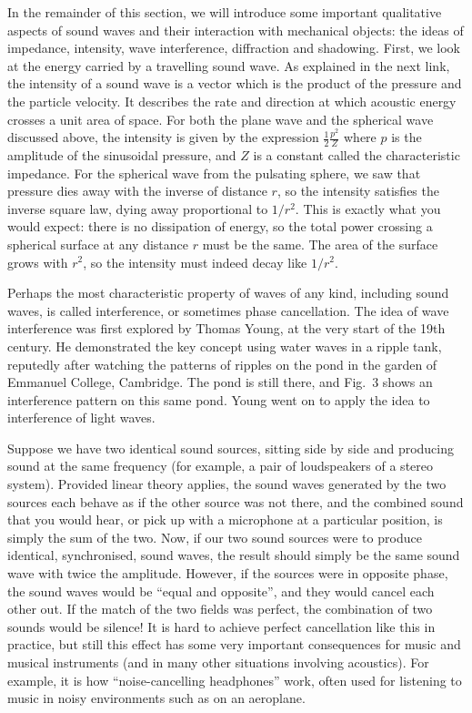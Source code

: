   In the remainder of this section, we will introduce some important 
  qualitative aspects of sound waves and their interaction with mechanical 
  objects: the ideas of impedance, intensity, wave interference, diffraction 
  and shadowing. First, we look at the energy carried by a travelling sound 
  wave. As explained in the next link, the intensity of a sound wave is a 
  vector which is the product of the pressure and the particle velocity. It 
  describes the rate and direction at which acoustic energy crosses a unit area 
  of space. For both the plane wave and the spherical wave discussed above, the 
  intensity is given by the expression $\frac{1}{2} \frac{p^2}{Z}$ where $p$ is 
  the amplitude of the sinusoidal pressure, and $Z$ is a constant called the 
  characteristic impedance. For the spherical wave from the pulsating sphere, 
  we saw that pressure dies away with the inverse of distance $r$, so the 
  intensity satisfies the inverse square law, dying away proportional to 
  $1/r^2$. This is exactly what you would expect: there is no dissipation of 
  energy, so the total power crossing a spherical surface at any distance $r$ 
  must be the same. The area of the surface grows with $r^2$, so the intensity 
  must indeed decay like $1/r^2$. 

  Perhaps the most characteristic property of waves of any kind, including 
  sound waves, is called interference, or sometimes phase cancellation. The 
  idea of wave interference was first explored by Thomas Young, at the very 
  start of the 19th century. He demonstrated the key concept using water waves 
  in a ripple tank, reputedly after watching the patterns of ripples on the 
  pond in the garden of Emmanuel College, Cambridge. The pond is still there, 
  and Fig.\ 3 shows an interference pattern on this same pond. Young went on to 
  apply the idea to interference of light waves. 

  Suppose we have two identical sound sources, sitting side by side and 
  producing sound at the same frequency (for example, a pair of loudspeakers of 
  a stereo system). Provided linear theory applies, the sound waves generated 
  by the two sources each behave as if the other source was not there, and the 
  combined sound that you would hear, or pick up with a microphone at a 
  particular position, is simply the sum of the two. Now, if our two sound 
  sources were to produce identical, synchronised, sound waves, the result 
  should simply be the same sound wave with twice the amplitude. However, if 
  the sources were in opposite phase, the sound waves would be ``equal and 
  opposite'', and they would cancel each other out. If the match of the two 
  fields was perfect, the combination of two sounds would be silence! It is 
  hard to achieve perfect cancellation like this in practice, but still this 
  effect has some very important consequences for music and musical instruments 
  (and in many other situations involving acoustics). For example, it is how 
  ``noise-cancelling headphones'' work, often used for listening to music in 
  noisy environments such as on an aeroplane. 

